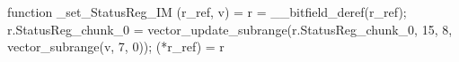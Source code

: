 function _set_StatusReg_IM (r_ref, v) = {
    r = __bitfield_deref(r_ref);
    r.StatusReg_chunk_0 = vector_update_subrange(r.StatusReg_chunk_0, 15, 8, vector_subrange(v, 7, 0));
    (*r_ref) = r
}
